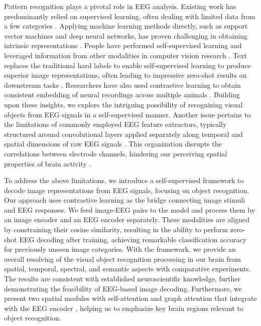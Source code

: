 Pattern recognition plays a pivotal role in EEG analysis. 
Existing work has predominantly relied on supervised learning, often dealing with limited data from a few categories \citep{cheng2022vigilancenet}.
Applying machine learning methods directly, such as support vector machines and deep neural networks, has proven challenging in obtaining intrinsic representations \citep{fu2022multiview, liu2021improvinga}.
People have performed self-supervised learning and leveraged information from other modalities in computer vision research \citep{NEURIPS2022_259a5df4}. 
Text replaces the traditional hard labels to enable self-supervised learning to produce superior image representations, often leading to impressive zero-shot results on downstream tasks \citep{radford2021learning}.
Researchers have also used contrastive learning to obtain consistent embedding of neural recordings across multiple animals \citep{schneider2023learnable}.
Building upon these insights, we explore the intriguing possibility of recognizing visual objects from EEG signals in a self-supervised manner.
Another issue pertains to the limitations of commonly employed EEG feature extractors, typically structured around convolutional layers applied separately along temporal and spatial dimensions of raw EEG signals \citep{schirrmeister2017deepa, lawhern2018eegneta, song2023eega}.
This organization disrupts the correlations between electrode channels, hindering our perceiving spatial properties of brain activity \citep{ding2023lggnet}.

To address the above limitations, we introduce a self-supervised framework to decode image representations from EEG signals, focusing on object recognition. 
Our approach uses contrastive learning as the bridge connecting image stimuli and EEG responses.
We feed image-EEG pairs to the model and process them by an image encoder and an EEG encoder separately.
These modalities are aligned by constraining their cosine similarity, resulting in the ability to perform zero-shot EEG decoding after training, achieving remarkable classification accuracy for previously unseen image categories.
With the framework, we provide an overall resolving of the visual object recognition processing in our brain from spatial, temporal, spectral, and semantic aspects with comparative experiments.
The results are consistent with established neuroscientific knowledge, further demonstrating the feasibility of EEG-based image decoding.
Furthermore, we present two spatial modules with self-attention and graph attention that integrate with the EEG encoder \citep{dosovitskiy2021image, velickovic2018graph}, helping us to emphasize key brain regions relevant to object recognition.

